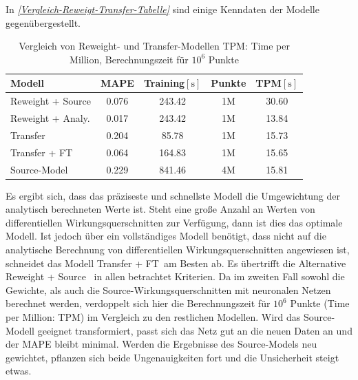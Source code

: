 In \textit{\autoref{Vergleich-Reweigt-Transfer-Tabelle}} sind einige Kenndaten der Modelle gegenübergestellt.
\begin{table} %
	\centering
	\begin{tabular}{|l|c|c|c|c|}
		\hline
		Modell & MAPE & Training$[\text{s}]$ & Punkte & TPM$[\text{s}]$ \\
		\hline
		Reweight + Source & 0.076 & 243.42 & 1M & 30.60 \\
		Reweight + Analy. &  0.017 & 243.42 & 1M & 13.84 \\
		Transfer & 0.204 & 85.78 & 1M & 15.73\\
		Transfer + FT & 0.064 & 164.83 & 1M & 15.65 \\
		Source-Model & 0.229 & 841.46 & 4M & 15.81\\
		\hline
	\end{tabular}
	\caption{Vergleich von Reweight- und Transfer-Modellen TPM: Time per Million, Berechnungszeit für $10^{6}$ Punkte}
	\label{Vergleich-Reweigt-Transfer-Tabelle}
\end{table}
Es ergibt sich, dass das präziseste und schnellste Modell die Umgewichtung der analytisch berechneten Werte ist. Steht eine große Anzahl an Werten von differentiellen Wirkungsquerschnitten zur Verfügung, dann ist dies das optimale Modell. Ist jedoch über ein vollständiges Modell benötigt, dass nicht auf die analytische Berechnung von differentiellen Wirkungsquerschnitten angewiesen ist, schneidet das Modell \glqq Transfer + FT\grqq~am Besten ab. Es übertrifft die Alternative \glqq Reweight + Source\grqq~ in allen betrachtet Kriterien. Da im zweiten Fall sowohl die Gewichte, als auch die Source-Wirkungsquerschnitten mit neuronalen Netzen berechnet werden, verdoppelt sich hier die Berechnungszeit für $10^{6}$ Punkte (Time per Million: TPM) im Vergleich zu den restlichen Modellen. Wird das Source-Modell geeignet transformiert, passt sich das Netz gut an die neuen Daten an und der MAPE bleibt minimal. Werden die Ergebnisse des Source-Models neu gewichtet, pflanzen sich beide Ungenauigkeiten fort und die Unsicherheit steigt etwas.

